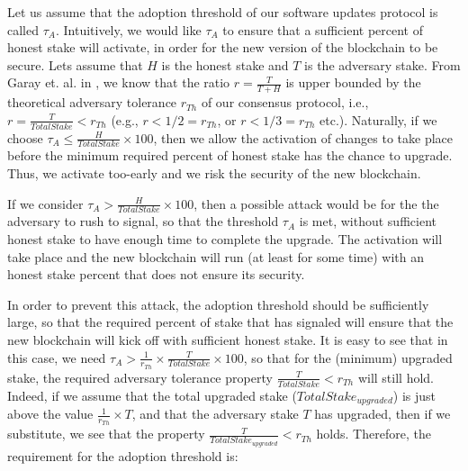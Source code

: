 Let us assume that the adoption threshold of our software updates protocol is called $\tau_A$. %
 Intuitively, we would like $\tau_A$ to ensure that a sufficient percent of honest stake will activate, in order for the new version of the blockchain to be secure. Lets assume that $H$ is the honest stake and $T$ is the adversary stake. From Garay et. al. in \cite{sok}, we know that the ratio $r = \frac{T}{T+H}$ is upper bounded by the theoretical adversary tolerance $r_{Th}$ of our consensus protocol, i.e., $r = \frac{T}{TotalStake} < r_{Th}$ (e.g., $r < 1/2 = r_{Th}$, or $r < 1/3 = r_{Th}$ etc.).
 Naturally, if we choose $\tau_A \leq \frac{H}{TotalStake}\times 100$, then we allow the activation of changes to take place before the minimum required percent of honest stake has the chance to upgrade. Thus, we activate too-early and we risk the security of the new blockchain. 

If we consider $\tau_A > \frac{H}{TotalStake} \times 100$, then a possible attack would be for the the adversary to rush to signal, so that the threshold $\tau_A$ is met, without sufficient honest stake to have enough time to complete the upgrade. The activation will take place and the new blockchain will run (at least for some time) with an honest stake percent that does not ensure its security. 

In order to prevent this attack, the adoption threshold should be sufficiently large, so that the required percent of stake that has signaled will ensure that the new blockchain will kick off with sufficient honest stake. It is easy to see that in this case, we need $\tau_A > \frac{1}{r_{Th}} \times \frac{T}{TotalStake}\times 100$, so that for the (minimum) upgraded stake, the required adversary tolerance property 
$\frac{T}{TotalStake} < r_{Th}$ will still hold. Indeed, if we assume that the total upgraded stake ($TotalStake_{upgraded}$) is just above the value $\frac{1}{r_{Th}} \times T$, and that the adversary stake $T$ has upgraded, then if we substitute, we see that the property $\frac{T}{TotalStake_{upgraded}} < r_{Th}$ holds. Therefore, the requirement for the adoption threshold is:


